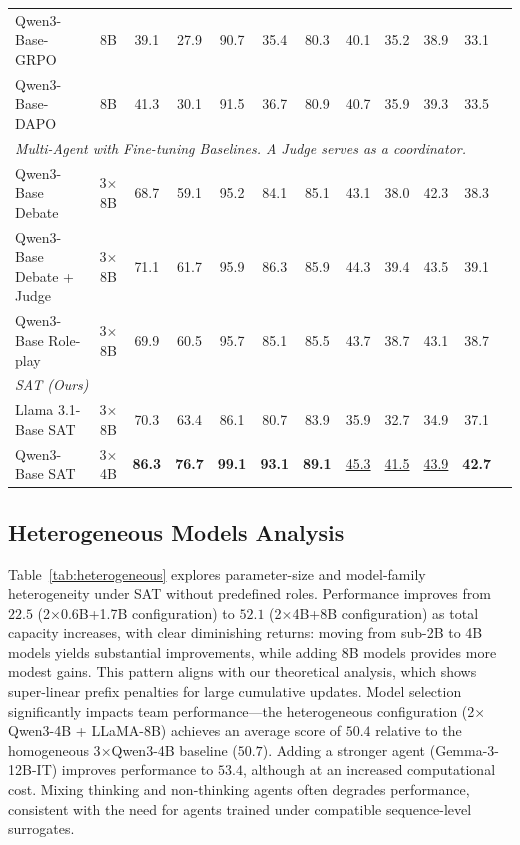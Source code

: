 \documentclass[sigconf]{aamas}
\begin{document}
\begin{table}[htbp]
\begin{tabular}{lccccccccccc}
Qwen3-Base-GRPO & 8B & 39.1 & 27.9 & 90.7 & 35.4 & 80.3 & 40.1 & 35.2 & 38.9 & 33.1 \\
Qwen3-Base-DAPO & 8B & 41.3 & 30.1 & 91.5 & 36.7 & 80.9 & 40.7 & 35.9 & 39.3 & 33.5 \\
\midrule
\multicolumn{11}{l}{\textit{Multi-Agent with Fine-tuning Baselines. A Judge serves as a coordinator.}} \\
Qwen3-Base Debate & 3$\times$8B & 68.7 & 59.1 & 95.2 & 84.1 & 85.1 & 43.1 & 38.0 & 42.3 & 38.3 \\
Qwen3-Base Debate + Judge & 3$\times$8B & 71.1 & 61.7 & 95.9 & 86.3 & 85.9 & 44.3 & 39.4 & 43.5 & 39.1 \\
Qwen3-Base Role-play & 3$\times$8B & 69.9 & 60.5 & 95.7 & 85.1 & 85.5 & 43.7 & 38.7 & 43.1 & 38.7 \\
\midrule
\multicolumn{11}{l}{\textit{SAT (Ours)}} \\
Llama 3.1-Base SAT & 3$\times$8B & 70.3 & 63.4 & 86.1 & 80.7 & 83.9 & 35.9 & 32.7 & 34.9 & 37.1 \\
Qwen3-Base SAT & 3$\times$4B & \textbf{86.3} & \textbf{76.7} & \textbf{99.1} & \textbf{93.1} & \textbf{89.1} & \underline{45.3} & \underline{41.5} & \underline{43.9} & \textbf{42.7} \\
\bottomrule
\end{tabular}
\end{table}

\subsection{Heterogeneous Models Analysis}
\label{sec:hetero-analysis}
Table~\ref{tab:heterogeneous} explores parameter-size and model-family heterogeneity under SAT without predefined roles. Performance improves from $22.5$ (2$\times$0.6B+1.7B configuration) to $52.1$ (2$\times$4B+8B configuration) as total capacity increases, with clear diminishing returns: moving from sub-2B to 4B models yields substantial improvements, while adding 8B models provides more modest gains. This pattern aligns with our theoretical analysis, which shows super-linear prefix penalties for large cumulative updates. Model selection significantly impacts team performance—the heterogeneous configuration (2$\times$Qwen3-4B + LLaMA-8B) achieves an average score of $50.4$ relative to the homogeneous 3$\times$Qwen3-4B baseline ($50.7$). Adding a stronger agent (Gemma-3-12B-IT) improves performance to $53.4$, although at an increased computational cost. Mixing thinking and non-thinking agents often degrades performance, consistent with the need for agents trained under compatible sequence-level surrogates.
\end{document}
